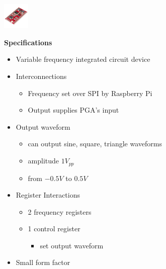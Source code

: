 \documentclass[25pt, a0paper, portrait, margin=0mm, innermargin=15mm, blockverticalspace=15mm, colspace=15mm, subcolspace=8mm]{tikzposter}
\begin{document}
\begin{columns}
{\begin{multicols}{2}
\end{multicols}
}

{
\begin{multicols}{2}

\begin{center}
\includegraphics[width=0.1\textwidth,keepaspectratio]{minigen_real.png}
\end{center}

\textbf{Specifications}
\begin{itemize}
\item Variable frequency integrated circuit device
\item Interconnections
  \begin{itemize}
  \item Frequency set over SPI by Raspberry Pi
  \item Output supplies PGA's input
  \end{itemize}
\item Output waveform
  \begin{itemize}
  \item can output sine, square, triangle waveforms
  \item amplitude $1V_{pp}$
  \item from $-0.5V$ to $0.5V$ 
  \end{itemize}
\item Register Interactions
  \begin{itemize}
  \item 2 frequency registers
  \item 1 control register 
    \begin{itemize}
    \item set output waveform
    \end{itemize}
  \end{itemize}
\item Small form factor
\end{itemize}


\end{multicols}}
\end{columns}
\end{document}
